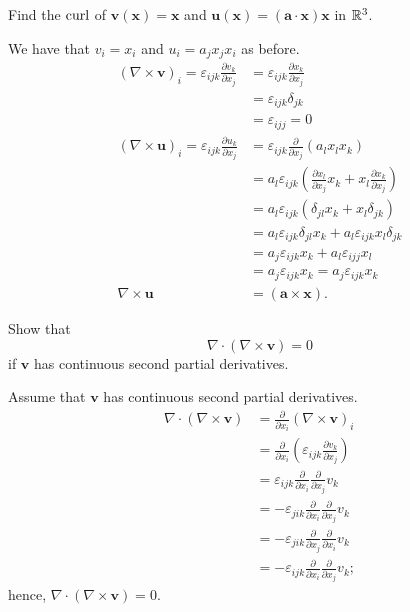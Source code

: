 \begin{example}
    Find the $\operatorname{curl}$ of $\bm v(\bm x) = \bm x$ and $\bm u(\bm x) = (\bm a \cdot \bm x) \bm x$ in $\mathbb{R}^3$.
\end{example}

\begin{solution}
    We have that $v_i = x_i$ and $u_i = a_jx_jx_i$ as before.
    \begin{align*}
        (\nabla \times \bm v)_i = \varepsilon_{ijk} \frac{\partial v_k}{\partial x_j} &= \varepsilon_{ijk} \frac{\partial x_k}{\partial x_j} \\
        &= \varepsilon_{ijk} \delta_{jk} \\
        &= \varepsilon_{ijj} = 0 \\
        (\nabla \times \bm u)_i = \varepsilon_{ijk} \frac{\partial u_k}{\partial x_j} &= \varepsilon_{ijk} \frac{\partial}{\partial x_j} (a_lx_lx_k) \\
        &= a_l \varepsilon_{ijk} \left( \frac{\partial x_l}{\partial x_j} x_k + x_l \frac{\partial x_k}{\partial x_j} \right) \\
        &= a_l \varepsilon_{ijk} ( \delta_{jl} x_k + x_l \delta_{jk}) \\
        &= a_l \varepsilon_{ijk} \delta_{jl} x_k + a_l \varepsilon_{ijk} x_l \delta_{jk} \\
        &= a_j \varepsilon_{ijk} x_k + a_l \varepsilon_{ijj} x_l \\
        &= a_j\varepsilon_{ijk} x_k = a_j \varepsilon_{ijk} x_k \\
        \nabla \times \bm u &= (\bm a \times \bm x).
    \end{align*}
\end{solution}

\begin{example}
    Show that
    \[ \nabla \cdot (\nabla \times \bm v) = 0 \]
    if $\bm v$ has continuous second partial derivatives.
\end{example}

\begin{solution}
    Assume that $\bm v$ has continuous second partial derivatives. 
    \begin{align*}
        \nabla \cdot (\nabla \times \bm v) &= \frac{\partial}{\partial x_i} (\nabla \times \bm v)_i \\
        &= \frac{\partial}{\partial x_i} \left( \varepsilon_{ijk} \frac{\partial v_k}{\partial x_j} \right) \\
        &= \varepsilon_{ijk} \frac{\partial}{\partial x_i} \frac{\partial}{\partial x_j} v_k \\
        &= -\varepsilon_{jik} \frac{\partial}{\partial x_i} \frac{\partial}{\partial x_j} v_k \\
        &= -\varepsilon_{jik} \frac{\partial}{\partial x_j} \frac{\partial}{\partial x_i} v_k \\
        &= -\varepsilon_{ijk} \frac{\partial}{\partial x_i} \frac{\partial}{\partial x_j} v_k;
    \end{align*}
    hence, $\nabla \cdot (\nabla \times \bm v) = 0$.
\end{solution}
